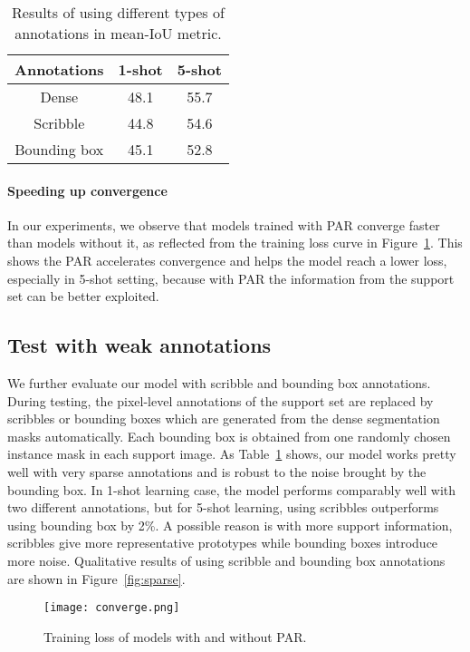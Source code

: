 \documentclass[10pt,twocolumn,letterpaper]{article}
\begin{document}
\begin{table}[t!]
\centering
 \begin{tabular}{c |c c}
 \toprule
 Annotations & 1-shot & 5-shot
 \\
 \midrule
 Dense & 48.1 & 55.7
 \\
 Scribble & 44.8 & 54.6
 \\
 Bounding box & 45.1 & 52.8
 \\
 \bottomrule
 \end{tabular}
 \caption{Results of using different types of annotations in mean-IoU metric.}
\label{table:pascal_result_sparse}
\end{table}

\vspace{-12pt}
\paragraph{Speeding up convergence} In our experiments, we observe that models trained  with  PAR  converge faster than models without it, as reflected from the training loss curve  in Figure~\ref{fig:converge}. This shows the PAR accelerates convergence and helps the model reach a lower loss, especially in 5-shot setting, because with PAR the information from the support set can be better exploited.

\subsection{Test with weak annotations} \label{sec:weak}

We further evaluate our model with scribble and bounding box annotations. During testing, the pixel-level annotations of the support set are replaced by scribbles or bounding boxes which are generated from the dense segmentation masks automatically. Each bounding box is obtained from one randomly chosen instance mask in each support image. As Table~\ref{table:pascal_result_sparse} shows, our model works pretty well with very sparse annotations and is robust to the noise brought by the bounding box. In 1-shot learning case, the model performs comparably well with two different annotations,  but for 5-shot learning, using scribbles outperforms using bounding box by 2\%. A possible reason is with more support information, scribbles give more representative prototypes while bounding boxes introduce more noise.
Qualitative results of using scribble and bounding box annotations are shown in Figure~\ref{fig:sparse}. 


\begin{figure}[t!]
\begin{center}
   \texttt{[image: converge.png]}
\end{center}
   \caption{Training loss of models with and without PAR.}
\label{fig:converge}
\end{figure}
\end{document}
